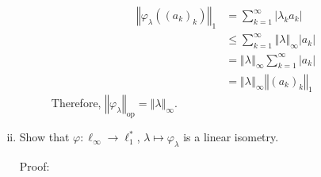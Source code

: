 \documentclass[8pt]{extarticle}
\newcommand{\norm}[1]{\left\Vert #1\right\Vert}
\begin{document}
\begin{enumerate}[(i)]
\begin{description}
          \begin{align*}
            \norm{\varphi_{\lambda}((a_k)_k)}_{1} &= \sum_{k=1}^{\infty}|\lambda_ka_k|\\
                                                  &\leq \sum_{k=1}^{\infty}\norm{\lambda}_{\infty}|a_k|\\
                                                  &= \norm{\lambda}_{\infty}\sum_{k=1}^{\infty}|a_k|\\
                                                  &= \norm{\lambda}_{\infty}\norm{(a_k)_k}_1
          \end{align*}
          Therefore, $\norm{\varphi_{\lambda}}_{\text{op}} = \norm{\lambda}_{\infty}$.
      \end{description}
    \item Show that $\varphi: \ell_{\infty}\rightarrow \ell_{1}^{\ast}$, $\lambda \mapsto \varphi_{\lambda}$ is a linear isometry.
      \begin{description}
        \item[Proof:] 
      \end{description}
  \end{enumerate}
\end{document}
